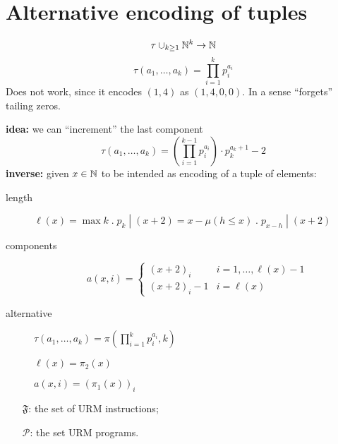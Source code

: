 \section{Alternative encoding of tuples}
$$\tau \cup_{k \geq 1} \mathbb{N}^k \to \mathbb{N}$$
$$\tau(a_1, \dots, a_k) = \prod_{i=1}^{k}p_i^{a_i}$$
Does not work, since it encodes $(1,4)$ as $(1,4,0,0)$. In a sense
``forgets'' tailing zeros.

\textbf{idea:} we can ``increment'' the last component
$$\tau(a_1, \dots, a_k) = (\prod_{i=1}^{k-1}p_i^{a_i}) \cdot p_k^{a_k+1} - 2$$
\textbf{inverse:} given $x \in \mathbb{N}$ to be intended as encoding of a
tuple of elements:

\begin{description}
\item[length]
  $\ell(x) = \max k \; . \; p_k \; | \; (x+2) = x - \mu (h \leq x) \;
  . \; p_{x-h} \; | \;(x+2)$
\item[components] \[a(x,i) = \begin{cases}
      (x+2)_i & i = 1, \dots, \ell(x)-1 \\
      (x+2)_i - 1 & i = \ell(x)
    \end{cases}\]
\item[alternative]{
    $\tau(a_1, \dots, a_k) = \pi(\prod_{i=1}^k p_i^{a_i}, k)$

    $\ell(x) = \pi_2(x)$

    $a(x,i) = (\pi_1(x))_i$
  }
\end{description}

\begin{notation}
  \begin{itemize}
  \item[$\mathfrak{F}$:] the set of URM instructions;
    \item[$\mathcal{P}$:] the set URM programs.
  \end{itemize}
\end{notation}


